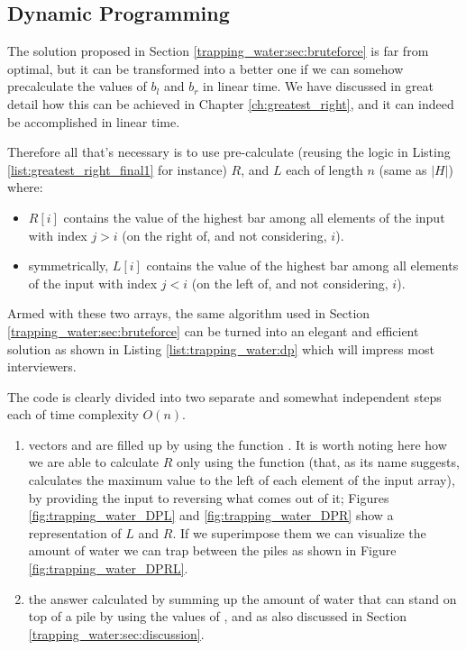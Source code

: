 \subsection{Dynamic Programming}
\label{trapping_water:sec:dp}
The solution proposed in Section \ref{trapping_water:sec:bruteforce} is far from optimal, but it can be transformed into a better one if we can somehow precalculate the values of $b_l$ and $b_r$ in linear time. 
We have discussed in great detail how this can be achieved in Chapter \ref{ch:greatest_right}, and it can indeed be accomplished in linear time. 

Therefore all that's necessary is to use pre-calculate (reusing the logic in Listing \ref{list:greatest_right_final1} for instance) $R$, and $L$ each of length $n$ (same as $|H|$) where: 
\begin{itemize}
	\item $R[i]$ contains the value of the highest bar among all elements of the input with index $j > i$ (on the right of, and not considering, $i$).
	\item symmetrically, $L[i]$ contains the value of the highest bar among all elements of the input with index $j < i$ (on the left of, and not considering, $i$).
\end{itemize}

Armed with these two arrays, the same algorithm used in Section \ref{trapping_water:sec:bruteforce} can be turned into an elegant and efficient solution as shown in  
Listing \ref{list:trapping_water:dp} which will impress most interviewers.



The code is clearly divided into two separate and somewhat independent steps each of time complexity $O(n)$. 
\begin{enumerate}
	\item vectors  and  are filled up by using the function . It is worth noting here how we are able to calculate $R$ only using the function  (that,  as its name suggests,  calculates the maximum value to the left of each element of the input array), by providing the input to  reversing what comes out of it; Figures \ref{fig:trapping_water_DPL} and \ref{fig:trapping_water_DPR} show a representation of $L$ and $R$. If we superimpose them we can visualize the amount of water we can trap between the piles as shown in  Figure 
	\ref{fig:trapping_water_DPRL}.
	\item the answer calculated by summing up the amount of water that can stand on top of a pile by using the values of  ,  and  as also discussed in Section \ref{trapping_water:sec:discussion}.
\end{enumerate}

